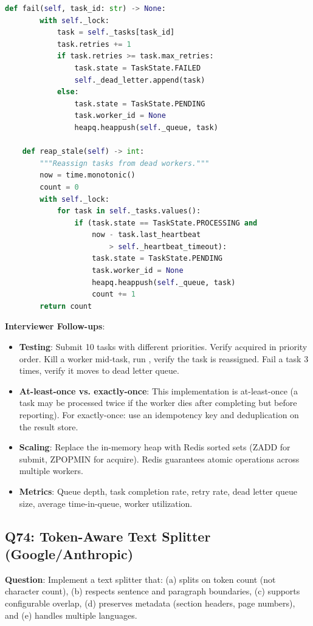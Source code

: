\begin{lstlisting}[language=Python]
    def fail(self, task_id: str) -> None:
        with self._lock:
            task = self._tasks[task_id]
            task.retries += 1
            if task.retries >= task.max_retries:
                task.state = TaskState.FAILED
                self._dead_letter.append(task)
            else:
                task.state = TaskState.PENDING
                task.worker_id = None
                heapq.heappush(self._queue, task)

    def reap_stale(self) -> int:
        """Reassign tasks from dead workers."""
        now = time.monotonic()
        count = 0
        with self._lock:
            for task in self._tasks.values():
                if (task.state == TaskState.PROCESSING and
                    now - task.last_heartbeat
                        > self._heartbeat_timeout):
                    task.state = TaskState.PENDING
                    task.worker_id = None
                    heapq.heappush(self._queue, task)
                    count += 1
        return count
\end{lstlisting}

\textbf{Interviewer Follow-ups}:
\begin{itemize}[leftmargin=*]
    \item \textbf{Testing}: Submit 10 tasks with different priorities. Verify acquired in priority order. Kill a worker mid-task, run , verify the task is reassigned. Fail a task 3 times, verify it moves to dead letter queue.
    \item \textbf{At-least-once vs. exactly-once}: This implementation is at-least-once (a task may be processed twice if the worker dies after completing but before reporting). For exactly-once: use an idempotency key and deduplication on the result store.
    \item \textbf{Scaling}: Replace the in-memory heap with Redis sorted sets (ZADD for submit, ZPOPMIN for acquire). Redis guarantees atomic operations across multiple workers.
    \item \textbf{Metrics}: Queue depth, task completion rate, retry rate, dead letter queue size, average time-in-queue, worker utilization.
\end{itemize}

\subsection{Q74: Token-Aware Text Splitter (Google/Anthropic)}

\textbf{Question}: Implement a text splitter that: (a) splits on token count (not character count), (b) respects sentence and paragraph boundaries, (c) supports configurable overlap, (d) preserves metadata (section headers, page numbers), and (e) handles multiple languages.

